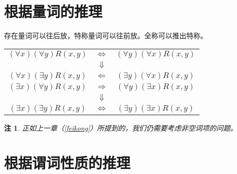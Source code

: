 \documentclass[12pt,onecolumn,a4paper]{book}
\newtheorem*{note}{注}
\numberwithin{table}{subsection}
\numberwithin{equation}{subsection}
\begin{document}
\section{根据量词的推理}

存在量词可以往后放，特称量词可以往前放。全称可以推出特称。

\begin{center}
    \begin{tabular}{ccc}
        $(\forall x)(\forall y)R(x,y)$ &$\Leftrightarrow$&$(\forall y)(\forall x)R(x,y)$\\
        &$\Downarrow$&\\
        $(\forall x)(\exists y)R(x,y)$&$\Leftarrow$&$(\exists y)(\forall x)R(x,y)$\\
    
        $(\exists x)(\forall y)R(x,y)$&$\Rightarrow$&$(\forall y)(\exists x)R(x,y)$\\
        &$\Downarrow$&\\
        $(\exists x)(\exists y)R(x,y)$&$\Leftrightarrow$&$(\exists y)(\exists x)R(x,y)$
    \end{tabular}
\end{center}

\begin{note}
    正如上一章（\ref{feikong}）所提到的，我们仍需要考虑非空词项的问题。
\end{note}

\section{根据谓词性质的推理}
\end{document}
